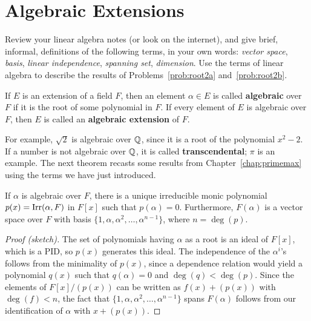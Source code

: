 \section{Algebraic Extensions}

\begin{problem}
    Review your linear algebra notes (or look on the internet), and give brief, informal, definitions of the following terms, in your own words: \textit{vector space}, \textit{basis}, \textit{linear independence}, \textit{spanning set}, \textit{dimension}. Use the terms of linear algebra to describe the results of Problems~\ref{prob:root2a} and~\ref{prob:root2b}.
\end{problem}

\begin{definition}\label{def:algebraic}
If $E$ is an extension of a field $F$, then an element $\alpha \in E$ is called \textbf{algebraic} over $F$ if it is the root of some polynomial in $F$. If every element of $E$ is algebraic over $F$, then $E$ is called an \textbf{algebraic extension} of $F$.
\end{definition}

For example, $\sqrt{2}$ is algebraic over $\mathbb{Q}$, since it is a root of the polynomial $x^2-2$. If a number is not algebraic over $\mathbb{Q}$, it is called \textbf{transcendental}; $\pi$ is an example. The next theorem recasts some results from Chapter~\ref{chap:primemax} using the terms we have just introduced.

\begin{theorem}\label{thm:aet}
    If $\alpha$ is algebraic over $F$, there is a unique irreducible monic polynomial $p(x) = \operatorname{Irr}(\alpha, F)$ in $F[x]$ such that $p(\alpha)=0$.  Furthermore, $F(\alpha)$ is a vector space over $F$ with basis $\{1, \alpha, \alpha^2, \ldots, \alpha^{n-1}\}$, where $n = \deg(p)$.
\begin{annotation}
\end{annotation}
\end{theorem}

\begin{proof}[Proof (sketch)]
The set of polynomials having $\alpha$ as a root is an ideal of $F[x]$, which is a PID, so $p(x)$ generates this ideal. The independence of the $\alpha^i$'s follows from the minimality of $p(x)$, since a dependence relation would yield a polynomial $q(x)$ such that $q(\alpha)=0$ and $\deg(q) < \deg(p)$. Since the elements of $F[x]/(p(x))$ can be written as $f(x) + (p(x))$ with $\deg(f)<n$, the fact that $\{1, \alpha, \alpha^2, \ldots, \alpha^{n-1}\}$ spans $F(\alpha)$ follows from our identification of $\alpha$ with $x + (p(x))$.
\end{proof}

